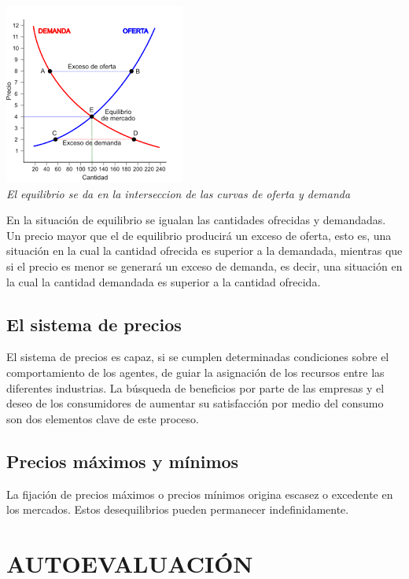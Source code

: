 \documentclass[12pt]{book}
\begin{document}
\begin {center}
\includegraphics[scale=.7]{images.png}
\\
\textit{{\tiny El equilibrio se da en la interseccion de las curvas de oferta y demanda}}
\end{center}


En la situación de equilibrio se igualan las cantidades ofrecidas y demandadas. Un precio mayor que el de equilibrio producirá un exceso de oferta, esto es, una situación en la cual la cantidad ofrecida es superior a la demandada, mientras que si el precio es
menor se generará un exceso de demanda, es decir, una situación en la cual la cantidad demandada es superior a la cantidad ofrecida.


\section{El sistema de precios}
El sistema de precios es capaz, si se cumplen determinadas condiciones sobre el comportamiento de los agentes, de guiar la asignación de los recursos entre las diferentes industrias. La búsqueda de beneficios por parte de las empresas y el deseo de
los consumidores de aumentar su satisfacción por medio del consumo son dos elementos clave de este proceso.


\section{Precios máximos y mínimos }
La fijación de precios máximos o precios mínimos origina escasez o excedente en los mercados. 
Estos desequilibrios pueden permanecer indefinidamente.



\chapter{AUTOEVALUACIÓN}
\end{document}
